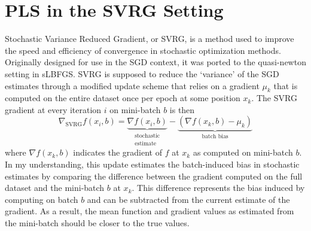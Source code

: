 \documentclass{article}
\begin{document}
\section{PLS in the SVRG Setting}
Stochastic Variance Reduced Gradient, or SVRG, is a method used to improve the speed and efficiency of convergence in stochastic optimization methods. Originally designed for use in the SGD context, it was ported to the quasi-newton setting in sLBFGS. SVRG is supposed to reduce the `variance' of the SGD estimates through a modified update scheme that relies on a gradient $\mu_k$ that is computed on the entire dataset once per epoch at some position $x_k$. The SVRG gradient at every iteration $i$ on mini-batch $b$ is then
\begin{equation}
\label{eq:svrg}
\nabla_{\text{SVRG}} f(x_i, b) = \underbrace{\nabla f(x_i, b)}_{\substack{\text{stochastic} \\ \text{estimate}}} - \underbrace{(\nabla f(x_k, b) - \mu_k)}_{\text{batch bias}}
\end{equation}
where $\nabla f(x_k, b)$ indicates the gradient of $f$ at $x_k$ as computed on mini-batch $b$. In my understanding, this update estimates the batch-induced bias in stochastic estimates by comparing the difference between the gradient computed on the full dataset and the mini-batch $b$ at $x_k$. This difference represents the bias induced by computing on batch $b$ and can be subtracted from the current estimate of the gradient. As a result, the mean function and gradient values as estimated from the mini-batch should be closer to the true values.
\end{document}
